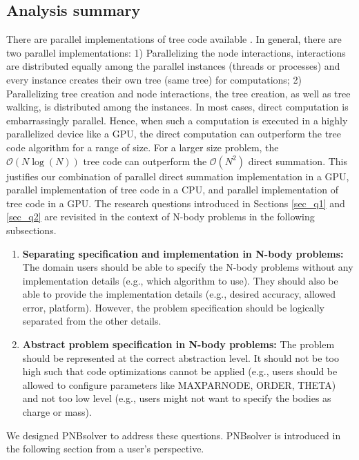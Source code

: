 \documentclass[draftclsnofoot]{elsarticle}
\begin{document}
\subsection{Analysis summary} 
There are parallel implementations of tree code available \cite{ewald,gputree,bonzai}. In general, there are two parallel implementations: 1) Parallelizing the node interactions, 
interactions are distributed equally among the parallel instances (threads or processes) and every instance creates their own tree (same tree) for computations; 
2) Parallelizing tree creation and node interactions, the tree creation, as well as tree walking, is distributed among the instances.
In most cases, direct computation is embarrassingly parallel. Hence, when such a computation is executed in a highly parallelized device like a GPU, the direct computation can outperform
the tree code algorithm for a range of size. For a larger size problem, the $\mathcal{O}(N\log(N))$ tree code can outperform the $\mathcal{O}({N^2})$ direct summation.  This justifies 
our combination of parallel direct summation implementation in a GPU, parallel implementation of tree code in a CPU, 
and parallel implementation of tree code in a GPU. The research questions introduced in Sections \ref{sec_q1} and \ref{sec_q2} are revisited in the context of N-body problems 
in the following subsections. 

\begin{enumerate}
\item{\textbf{Separating specification and implementation in N-body problems:}}
The domain users should be able to specify the N-body problems without any implementation details (e.g., which algorithm to use). They should also be able to provide the 
implementation details (e.g., desired accuracy, allowed error, platform). However, the problem specification should be logically separated from the other details. 
\item{\textbf{ Abstract problem specification in N-body problems:}}
The problem should be represented at the correct abstraction level. It should not be too high such that code optimizations cannot be applied (e.g., users should be allowed to configure parameters
 like MAXPARNODE, ORDER, THETA) and not too low level (e.g., users might not want to specify the bodies as charge or mass). 
\end{enumerate}
We designed PNBsolver to address these questions.  PNBsolver is introduced in the following section from a user's perspective. 
\end{document}
